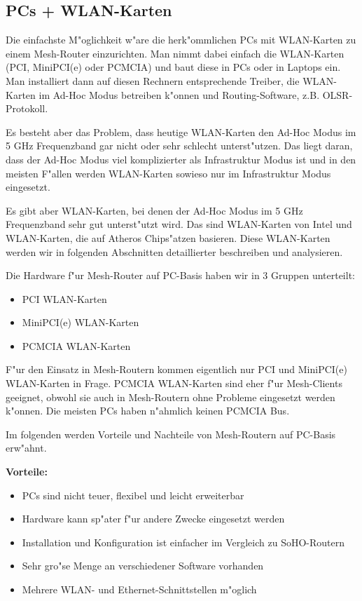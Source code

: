 \subsection{PCs + WLAN-Karten}

Die einfachste M"oglichkeit w"are die herk"ommlichen PCs mit
WLAN-Karten zu einem Mesh-Router einzurichten.  Man nimmt dabei
einfach die WLAN-Karten (PCI, MiniPCI(e) oder PCMCIA) und baut diese
in PCs oder in Laptops ein. Man installiert dann auf diesen Rechnern
entsprechende Treiber, die WLAN-Karten im Ad-Hoc Modus betreiben k"onnen
und Routing-Software, z.B. OLSR-Protokoll.

Es besteht aber das Problem, dass heutige WLAN-Karten den Ad-Hoc Modus im 5 GHz
Frequenzband gar nicht oder sehr schlecht unterst"utzen. Das liegt daran,
dass der Ad-Hoc Modus viel komplizierter als Infrastruktur Modus ist und
in den meisten F"allen werden WLAN-Karten sowieso nur im Infrastruktur Modus
eingesetzt.

Es gibt aber WLAN-Karten, bei denen der Ad-Hoc Modus im 5 GHz Frequenzband
sehr gut unterst"utzt wird. Das sind WLAN-Karten von Intel und WLAN-Karten,
die auf Atheros Chips"atzen basieren. Diese WLAN-Karten werden wir
in folgenden Abschnitten detaillierter beschreiben und analysieren.

Die Hardware f"ur Mesh-Router auf PC-Basis haben wir in 3 Gruppen unterteilt:

\begin{itemize}
\item PCI WLAN-Karten
\item MiniPCI(e) WLAN-Karten
\item PCMCIA WLAN-Karten
\end{itemize}

F"ur den Einsatz in Mesh-Routern kommen eigentlich nur PCI und MiniPCI(e)
WLAN-Karten in Frage. PCMCIA WLAN-Karten sind eher f"ur Mesh-Clients geeignet,
obwohl sie auch in Mesh-Routern ohne Probleme eingesetzt werden k"onnen.
Die meisten PCs haben n"ahmlich keinen PCMCIA Bus.

Im folgenden werden Vorteile und Nachteile von Mesh-Routern auf PC-Basis
erw"ahnt.

\textbf{Vorteile:}

\begin{itemize} 
\item PCs sind nicht teuer, flexibel und leicht erweiterbar
\item Hardware kann sp"ater f"ur andere Zwecke eingesetzt werden
\item Installation und Konfiguration ist einfacher im Vergleich zu SoHO-Routern
\item Sehr gro"se Menge an verschiedener Software vorhanden
\item Mehrere WLAN- und Ethernet-Schnittstellen m"oglich 
\end{itemize}

